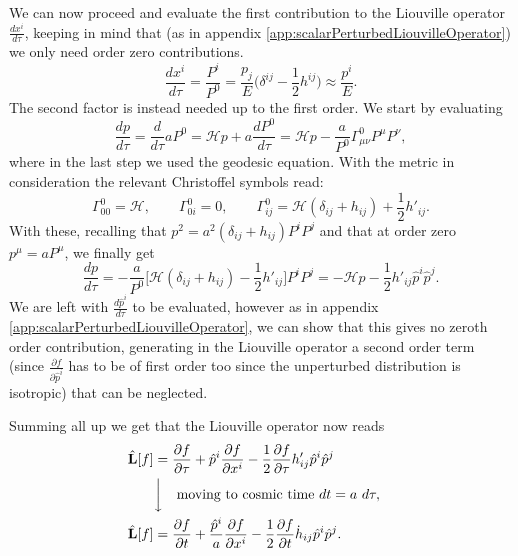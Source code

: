 We can now proceed and evaluate the first contribution to the Liouville operator $\frac{dx^i}{d\tau}$, keeping in mind that (as in appendix \ref{app:scalarPerturbedLiouvilleOperator}) we only need order zero contributions.
\begin{equation}\label{eq:B.4}
    \frac{dx^i}{d\tau}=\frac{P^i}{P^0}=\frac{p_j}{E}\bigg(\delta^{ij}-\frac{1}{2}h^{ij}\bigg)\approx\frac{p^i}{E}.
\end{equation}
The second factor is instead needed up to the first order. We start by evaluating
$$\frac{dp}{d\tau}=\frac{d}{d\tau}aP^0=\mathcal{H} p+a\frac{dP^0}{d\tau}=\mathcal{H} p-\frac{a}{P^0}\Gamma^0_{\mu\nu}P^\mu P^\nu,$$
where in the last step we used the geodesic equation. With the metric in consideration the relevant Christoffel symbols read:
$$\Gamma^0_{00}=\mathcal{H},\qquad \Gamma^0_{0i}=0,\qquad\Gamma^{0}_{ij}=\mathcal{H} (\delta_{ij}+h_{ij})+\frac{1}{2}h'_{ij}.$$
With these, recalling that $p^2=a^2(\delta_{ij}+h_{ij})P^i P^j$ and that at order zero $p^\mu=aP^\mu$, we finally get
\begin{equation}\label{eq:B.5}
   \frac{dp}{d\tau}=-\frac{a}{P^0}\bigg[\mathcal{H} (\delta_{ij}+h_{ij})-\frac{1}{2}h'_{ij}\bigg]P^i P^j=-\mathcal{H}p-\frac{1}{2}h'_{ij}\hat p^i\hat p^j.
\end{equation}
We are left with $\frac{d\hat p^i}{d\tau}$ to be evaluated, however as in appendix \ref{app:scalarPerturbedLiouvilleOperator}, we can show that this gives no zeroth order contribution, generating in the Liouville operator a second order term (since $\frac{\partial f}{\partial\hat p^i}$ has to be of first order too since the unperturbed distribution is isotropic) that can be neglected.

Summing all up we get that the Liouville operator now reads
\begin{align}\label{eq:tensorPerturbedLiouvilleOperator}
   \hat{\mathbf{L}}[f]&=\frac{\partial f}{\partial\tau}+\hat p^i\frac{\partial f}{\partial x^i}-\frac{1}{2}\frac{\partial f}{\partial \tau}h'_{ij}\hat p^i\hat p^j\nonumber&&\\
   &\bigg\downarrow\quad\text{moving to cosmic time } dt=a\ d\tau,\nonumber&&\\
   \hat{\mathbf{L}}[f]&=\frac{\partial f}{\partial t}+\frac{\hat p^i}{a}\frac{\partial f}{\partial x^i}-\frac{1}{2}\frac{\partial f}{\partial t}\dot{h}_{ij}\hat p^i\hat p^j.&&
\end{align}